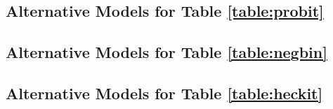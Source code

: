 \documentclass[11pt, oneside]{article}
\begin{document}
\subsection{Alternative Models for Table \ref{table:probit}}








\subsection{Alternative Models for Table \ref{table:negbin}}








\subsection{Alternative Models for Table \ref{table:heckit}}










\end{document}
